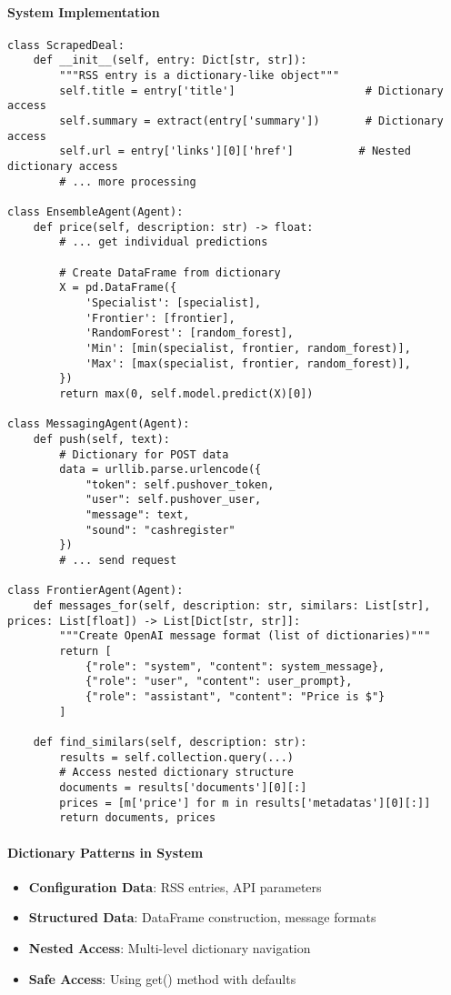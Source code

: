\paragraph{System Implementation}
\begin{lstlisting}[caption=Dictionary Usage in Agent System]
class ScrapedDeal:
    def __init__(self, entry: Dict[str, str]):
        """RSS entry is a dictionary-like object"""
        self.title = entry['title']                    # Dictionary access
        self.summary = extract(entry['summary'])       # Dictionary access
        self.url = entry['links'][0]['href']          # Nested dictionary access
        # ... more processing

class EnsembleAgent(Agent):
    def price(self, description: str) -> float:
        # ... get individual predictions
        
        # Create DataFrame from dictionary
        X = pd.DataFrame({
            'Specialist': [specialist],
            'Frontier': [frontier],
            'RandomForest': [random_forest],
            'Min': [min(specialist, frontier, random_forest)],
            'Max': [max(specialist, frontier, random_forest)],
        })
        return max(0, self.model.predict(X)[0])

class MessagingAgent(Agent):
    def push(self, text):
        # Dictionary for POST data
        data = urllib.parse.urlencode({
            "token": self.pushover_token,
            "user": self.pushover_user,
            "message": text,
            "sound": "cashregister"
        })
        # ... send request

class FrontierAgent(Agent):
    def messages_for(self, description: str, similars: List[str], prices: List[float]) -> List[Dict[str, str]]:
        """Create OpenAI message format (list of dictionaries)"""
        return [
            {"role": "system", "content": system_message},
            {"role": "user", "content": user_prompt},
            {"role": "assistant", "content": "Price is $"}
        ]

    def find_similars(self, description: str):
        results = self.collection.query(...)
        # Access nested dictionary structure
        documents = results['documents'][0][:]
        prices = [m['price'] for m in results['metadatas'][0][:]]
        return documents, prices
\end{lstlisting}

\paragraph{Dictionary Patterns in System}
\begin{itemize}
\item \textbf{Configuration Data}: RSS entries, API parameters
\item \textbf{Structured Data}: DataFrame construction, message formats
\item \textbf{Nested Access}: Multi-level dictionary navigation
\item \textbf{Safe Access}: Using get() method with defaults
\end{itemize}

